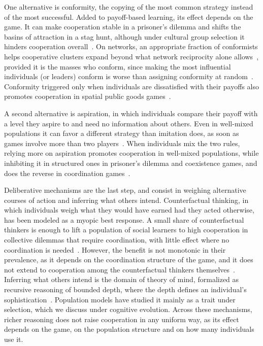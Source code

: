 One alternative is conformity, the copying of the most common strategy instead of the most successful. Added to payoff-based learning, its effect depends on the game. It can make cooperation stable in a prisoner's dilemma and shifts the basins of attraction in a stag hunt, although under cultural group selection it hinders cooperation overall~\cite{mollemanEffectsConformismCultural2013}. On networks, an appropriate fraction of conformists helps cooperative clusters expand beyond what network reciprocity alone allows~\cite{szolnokiConformityEnhancesNetwork2015}, provided it is the masses who conform, since making the most influential individuals (or leaders) conform is worse than assigning conformity at random~\cite{szolnokiLeadersShouldNot2016}. Conformity triggered only when individuals are dissatisfied with their payoffs also promotes cooperation in spatial public goods games~\cite{quanRationalConformityBehavior2022}.

A second alternative is aspiration, in which individuals compare their payoff with a level they aspire to and need no information about others. Even in well-mixed populations it can favor a different strategy than imitation does, as soon as games involve more than two players~\cite{duAspirationDynamicsMultiplayer2014}. When individuals mix the two rules, relying more on aspiration promotes cooperation in well-mixed populations, while inhibiting it in structured ones in prisoner's dilemma and coexistence games, and does the reverse in coordination games~\cite{wangEvolutionaryGameDynamics2019}.

Deliberative mechanisms are the last step, and consist in weighing alternative courses of action and inferring what others intend. Counterfactual thinking, in which individuals weigh what they would have earned had they acted otherwise, has been modeled as a myopic best response. A small share of counterfactual thinkers is enough to lift a population of social learners to high cooperation in collective dilemmas that require coordination, with little effect where no coordination is needed~\cite{pereiraCounterfactualThinkingCooperation2019}. However, the benefit is not monotonic in their prevalence, as it depends on the coordination structure of the game, and it does not extend to cooperation among the counterfactual thinkers themselves~\cite{fernandesCounterfactualThinkingStochastic2024}. Inferring what others intend is the domain of theory of mind, formalized as recursive reasoning of bounded depth, where the depth defines an individual's sophistication~\cite{yoshidaGameTheoryMind2008}. Population models have studied it mainly as a trait under selection, which we discuss under cognitive evolution. Across these mechanisms, richer reasoning does not raise cooperation in any uniform way, as its effect depends on the game, on the population structure and on how many individuals use it.

